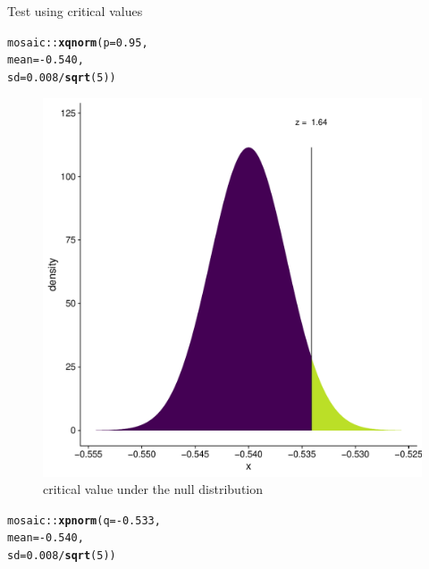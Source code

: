\documentclass[10pt]{beamer}\usepackage[]{graphicx}\usepackage[]{color}
\makeatletter
\def\maxwidth{ %
  \ifdim\Gin@nat@width>\linewidth
    \linewidth
  \else
    \Gin@nat@width
  \fi
}
\newcommand{\hlnum}[1]{\textcolor[rgb]{0.686,0.059,0.569}{#1}}%
\newcommand{\hlopt}[1]{\textcolor[rgb]{0,0,0}{#1}}%
\newcommand{\hlstd}[1]{\textcolor[rgb]{0.345,0.345,0.345}{#1}}%
\newcommand{\hlkwc}[1]{\textcolor[rgb]{0.333,0.667,0.333}{#1}}%
\newcommand{\hlkwd}[1]{\textcolor[rgb]{0.737,0.353,0.396}{\textbf{#1}}}%
\newenvironment{kframe}{%
 \def\at@end@of@kframe{}%
 \ifinner\ifhmode%
  \def\at@end@of@kframe{\end{minipage}}%
  \begin{minipage}{\columnwidth}%
 \fi\fi%
 \def\FrameCommand##1{\hskip\@totalleftmargin \hskip-\fboxsep
 \colorbox{shadecolor}{##1}\hskip-\fboxsep
     \hskip-\linewidth \hskip-\@totalleftmargin \hskip\columnwidth}%
 \MakeFramed {\advance\hsize-\width
   \@totalleftmargin\z@ \linewidth\hsize
   \@setminipage}}%
 {\par\unskip\endMakeFramed%
 \at@end@of@kframe}
\newenvironment{knitrout}{}{} %
\makeatother
\begin{document}
\begin{frame}[fragile]{Test using critical values}
	
	
	\begin{minipage}{0.47\textwidth}
\begin{knitrout}\tiny
{}\color{fgcolor}\begin{kframe}
\begin{alltt}
\hlstd{mosaic}\hlopt{::}\hlkwd{xqnorm}\hlstd{(}\hlkwc{p} \hlstd{=} \hlnum{0.95}\hlstd{,}
\hlkwc{mean} \hlstd{=} \hlopt{-}\hlnum{0.540}\hlstd{,}
\hlkwc{sd} \hlstd{=} \hlnum{0.008}\hlopt{/}\hlkwd{sqrt}\hlstd{(}\hlnum{5}\hlstd{))}
\end{alltt}
\end{kframe}\begin{figure}

{\centering \includegraphics[width=\maxwidth]{figure/unnamed-chunk-5-1} 

}

\caption[critical value under the null distribution]{critical value under the null distribution}\label{fig:unnamed-chunk-5}
\end{figure}

\end{knitrout}
	\end{minipage}
	\begin{minipage}{0.47\textwidth}
\begin{knitrout}\tiny
{}\color{fgcolor}\begin{kframe}
\begin{alltt}
\hlstd{mosaic}\hlopt{::}\hlkwd{xpnorm}\hlstd{(}\hlkwc{q} \hlstd{=} \hlopt{-}\hlnum{0.533}\hlstd{,}
\hlkwc{mean} \hlstd{=} \hlopt{-}\hlnum{0.540}\hlstd{,}
\hlkwc{sd} \hlstd{=} \hlnum{0.008}\hlopt{/}\hlkwd{sqrt}\hlstd{(}\hlnum{5}\hlstd{))}
\end{alltt}
\end{kframe}\begin{figure}


\end{figure}
\end{knitrout}
\end{minipage}
\end{frame}
\end{document}
